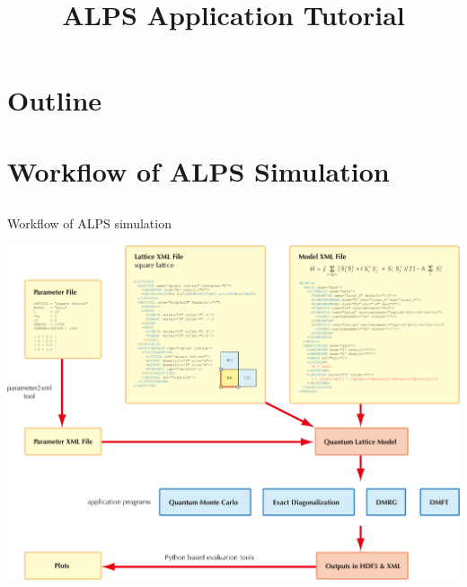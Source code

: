
\title{ALPS Application Tutorial}




\begin{frame}
  \titlepage
\end{frame}

\section*{Outline}
\begin{frame}[t,fragile]
   \tableofcontents
\end{frame}

\section{Workflow of ALPS Simulation}
\subsection*{\redb\blueb\greenb}

\begin{frame}{Workflow of ALPS simulation}
  \begin{center}
    \includegraphics[height=0.8\textheight]{workflow.pdf}
  \end{center}
\end{frame}


